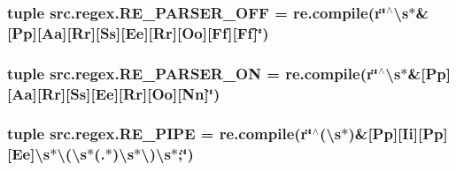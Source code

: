 \hypertarget{namespacesrc_1_1regex_a38573dab2556e8c2727a19f54f2cd6b1}{
\subsubsection[{R\-E\-\_\-\-P\-A\-R\-S\-E\-R\-\_\-\-O\-F\-F}]{\setlength{\rightskip}{0pt plus 5cm}tuple src.\-regex.\-R\-E\-\_\-\-P\-A\-R\-S\-E\-R\-\_\-\-O\-F\-F = re.\-compile(r\char`\"{}$^\wedge$\textbackslash{}s$\ast$\&\mbox{[}Pp\mbox{]}\mbox{[}Aa\mbox{]}\mbox{[}Rr\mbox{]}\mbox{[}Ss\mbox{]}\mbox{[}Ee\mbox{]}\mbox{[}Rr\mbox{]}\mbox{[}Oo\mbox{]}\mbox{[}Ff\mbox{]}\mbox{[}Ff\mbox{]}\char`\"{})}}\label{namespacesrc_1_1regex_a38573dab2556e8c2727a19f54f2cd6b1}
\hypertarget{namespacesrc_1_1regex_ae22c01346c8428aee105b11ab237044d}{
\subsubsection[{R\-E\-\_\-\-P\-A\-R\-S\-E\-R\-\_\-\-O\-N}]{\setlength{\rightskip}{0pt plus 5cm}tuple src.\-regex.\-R\-E\-\_\-\-P\-A\-R\-S\-E\-R\-\_\-\-O\-N = re.\-compile(r\char`\"{}$^\wedge$\textbackslash{}s$\ast$\&\mbox{[}Pp\mbox{]}\mbox{[}Aa\mbox{]}\mbox{[}Rr\mbox{]}\mbox{[}Ss\mbox{]}\mbox{[}Ee\mbox{]}\mbox{[}Rr\mbox{]}\mbox{[}Oo\mbox{]}\mbox{[}Nn\mbox{]}\char`\"{})}}\label{namespacesrc_1_1regex_ae22c01346c8428aee105b11ab237044d}
\hypertarget{namespacesrc_1_1regex_a9bfab2c83b0d9e0db1f4e8915d8c688f}{
\subsubsection[{R\-E\-\_\-\-P\-I\-P\-E}]{\setlength{\rightskip}{0pt plus 5cm}tuple src.\-regex.\-R\-E\-\_\-\-P\-I\-P\-E = re.\-compile(r\char`\"{}$^\wedge$(\textbackslash{}s$\ast$)\&\mbox{[}Pp\mbox{]}\mbox{[}Ii\mbox{]}\mbox{[}Pp\mbox{]}\mbox{[}Ee\mbox{]}\textbackslash{}s$\ast$\textbackslash{}(\textbackslash{}s$\ast$(.$\ast$)\textbackslash{}s$\ast$\textbackslash{})\textbackslash{}s$\ast$;\char`\"{})}}\label{namespacesrc_1_1regex_a9bfab2c83b0d9e0db1f4e8915d8c688f}
